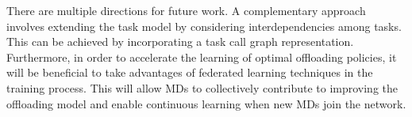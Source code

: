 \documentclass[10pt, journal,letterpaper]{IEEEtran}
\begin{document}
There are multiple directions for future work. A complementary approach involves extending the task model by considering interdependencies among tasks. This can be achieved by incorporating a task call graph representation. Furthermore, in order to accelerate the learning of optimal offloading policies, it will be beneficial to take advantages of federated learning techniques in the training process. This will allow MDs to collectively contribute to improving the offloading model and enable continuous learning when new MDs join the network.






%
%
%
%
%
%
%
%
%
%
% 
%
%
%
%
%
\end{document}
